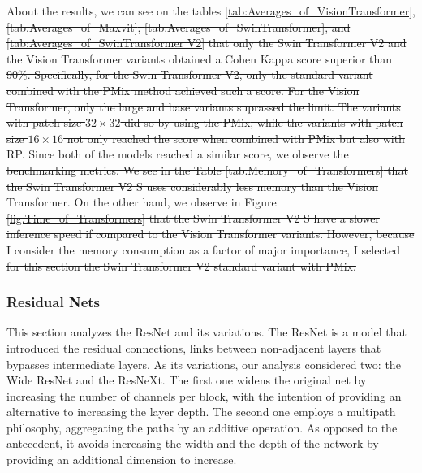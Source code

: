 \sout{
About the results, we can see on the tables \ref{tab:Averages_of_VisionTransformer}, \ref{tab:Averages_of_Maxvit}, \ref{tab:Averages_of_SwinTransformer}, and \ref{tab:Averages_of_SwinTransformer V2} that only the Swin Transformer V2 and the Vision Transformer variants obtained a Cohen Kappa score superior than 90\%. Specifically, for the Swin Transformer V2, only the standard variant combined with the \gls{PMix} method achieved such a score. For the Vision Transformer, only the large and base variants suprassed the limit. The variants with patch size $32\times 32$ did so by using the \gls{PMix}, while the variants with patch size $16 \times 16$ not only reached the score when combined with \gls{PMix} but also with \gls{RP}. Since both of the models reached a similar score, we observe the benchmarking metrics. We see in the Table \ref{tab:Memory_of_Transformers} that the Swin Transformer V2 S uses considerably less memory than the Vision Transformer. On the other hand, we observe in Figure \ref{fig:Time_of_Transformers} that the Swin Transformer V2 S have a slower inference speed if compared to the Vision Transformer variants. However, because I consider the memory consumption as a factor of major importance, I selected for this section the Swin Transformer V2 standard variant with \gls{PMix}.
}






\FloatBarrier

\subsubsection{Residual Nets}

This section analyzes the ResNet and its variations. The ResNet is a model that introduced the residual connections, links between non-adjacent layers that bypasses intermediate layers. As its variations, our analysis considered two: the Wide ResNet and the ResNeXt. The first one widens the original net by increasing the number of channels per block, with the intention of providing an alternative to increasing the layer depth. The second one employs a multipath philosophy, aggregating the paths by an additive operation. As opposed to the antecedent, it avoids increasing the width and the depth of the network by providing an additional dimension to increase. 

